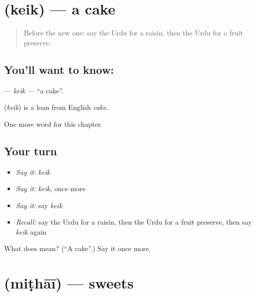 \section[\texorpdfstring{\ur{کیک} (keik)}{کیک (keik)}]{ (keik) — a cake}

\label{lesson:UR-C167-keik}



\begin{quote}
Before the new one: say the Urdu for a raisin, then the Urdu for a fruit preserve.
\end{quote}

\subsection*{You'll want to know: }
\textbf{} — \emph{keik} — \textquotedblleft{}a cake\textquotedblright{}.

\begin{cousinweb}
\textbf{} (\emph{keik}) is a loan from English \emph{cake}.
\end{cousinweb}

\begin{grammarlens}[title={What you've built}]
One more word for this chapter.
\end{grammarlens}

\subsection*{Your turn}
\begin{itemize}
\raggedright
  \item \emph{Say it:} \emph{keik}
  \item \emph{Say it:} \emph{keik}, once more
  \item \emph{Say it:} say \emph{keik}
  \item \emph{Recall:} say the Urdu for a raisin, then the Urdu for a fruit preserve, then say \emph{keik} again
\end{itemize}

\begin{tcolorbox}[breakable,colback=teal!4,colframe=teal!35!black,title={Before you move on}]
What does  mean? (\textquotedblleft{}A cake\textquotedblright{}.) Say it once more.
\end{tcolorbox}
\section[\texorpdfstring{\ur{مٹھائی} (miṭhāī)}{مٹھائی (miṭhāī)}]{ (miṭhāī) — sweets}

